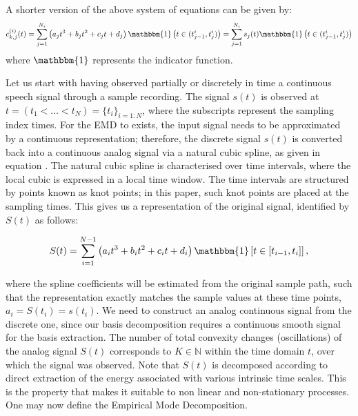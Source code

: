 A shorter version of the above system of equations can be given by:
\begin{equation}
c_{k,j}^{(i)}(t) = \sum_{j = 1}^{N_i} \left( a_j t^3 + b_j t^2 + c_j t + d_j \right){\mathbbm{1}} \left( t \in (t_{j-1}^i, t_j^i) \right) = \sum_{j = 1}^{N_i} s_j (t) {\mathbbm{1}} \left( t \in (t_{j-1}^i, t_j^i) \right) 
\end{equation}
where $\mathbbm{1}$ represents the indicator function.

Let us start with having observed partially or discretely in time a continuous speech signal through a sample recording. The signal $s(t)$ is observed at $t =( t_1 < \dots <t_N ) = \{ t_i \}_{i=1:N}$, where the subscripts represent the sampling index times. For the EMD to exists, the input signal needs to be approximated by a continuous representation; therefore, the discrete signal $s(t)$ is converted back into a continuous analog signal via a natural cubic spline, as given in equation \label{cubic_spl}. The natural cubic spline is characterised over time intervals, where the local cubic is expressed in a local time window. The time intervals are structured by points known as knot points; in this paper, such knot points are placed at the sampling times. This gives us a representation of the original signal, identified by $S(t)$ as follows:

\begin{equation}
\label{cubic_spl}
S(t) = \sum_{i=1}^{N-1} \left(a_i t^3 +b_i t^2 + c_i t +d_i \right) \mathbbm{1} \left[ t \in \left[ t_{i-1},t_i \right] \right],
\end{equation} 

where the spline coefficients will be estimated from the original sample path, such that the representation exactly matches the sample values at these time points, $a_i = S(t_i) = s(t_i)$. We need to construct an analog continuous signal from the discrete one, since our basis decomposition requires a continuous smooth signal for the basis extraction. The number of total convexity changes (oscillations) of the analog signal $S(t)$ corresponds to $K \in \mathbb{N}$ within the time domain $t$, over which the signal was observed. Note that $S(t)$ is decomposed according to direct extraction of the energy associated with various intrinsic time scales. This is the property that makes it suitable to non linear and non-stationary processes. One may now define the  Empirical Mode Decomposition.


